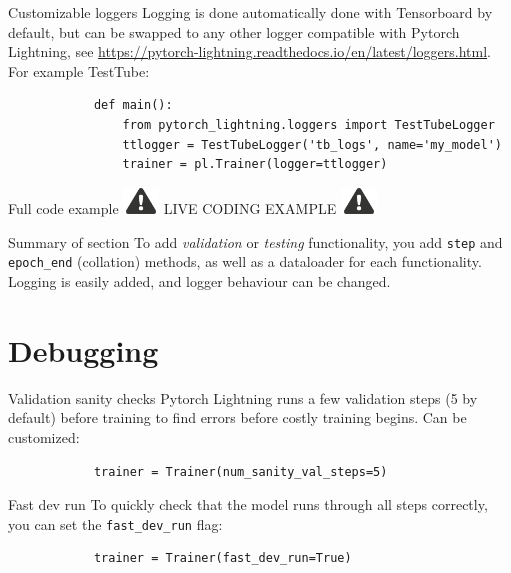 \documentclass[aspectratio=169]{beamer}
\newcommand{\alertsymb}{\includegraphics[height=0.7cm]{alert.png}}
\newcommand{\livecode}{\Large \centering \alertsymb \hspace{1em}
	LIVE CODING EXAMPLE \hspace{1em} \alertsymb}
\begin{document}
	\begin{frame}[fragile]{Customizable loggers}
		Logging is done automatically done with Tensorboard by default, but can be swapped to any other logger compatible with Pytorch Lightning, see \url{https://pytorch-lightning.readthedocs.io/en/latest/loggers.html}. For example TestTube:

		\begin{verbatim}
			def main():
				from pytorch_lightning.loggers import TestTubeLogger
				ttlogger = TestTubeLogger('tb_logs', name='my_model')
				trainer = pl.Trainer(logger=ttlogger)
		\end{verbatim}
	\end{frame}

	\begin{frame}{Full code example}
		\livecode
	\end{frame}

	\begin{frame}{Summary of section}
		To add \emph{validation} or \emph{testing} functionality, you add \texttt{step} and \texttt{epoch\_end} (collation) methods, as well as a dataloader for each functionality.
		\vfill
		Logging is easily added, and logger behaviour can be changed.
	\end{frame}
	
	\section{Debugging}
	
	\begin{frame}[fragile]{Validation sanity checks}
		Pytorch Lightning runs a few validation steps (5 by default) before training to find errors before costly training begins. Can be customized:
		\begin{verbatim}
			trainer = Trainer(num_sanity_val_steps=5)
		\end{verbatim}
	\end{frame}

	\begin{frame}[fragile]{Fast dev run}
		To quickly check that the model runs through all steps correctly, you can set the \texttt{fast\_dev\_run} flag:

		\begin{verbatim}
			trainer = Trainer(fast_dev_run=True)
		\end{verbatim}
	\end{frame}
\end{document}
